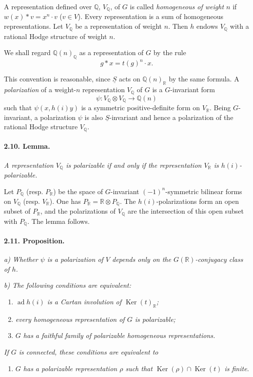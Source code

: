 \documentclass[10pt,leqno]{article}
\newcommand{\Q}{\mathbb{Q}}
\newcommand{\R}{\mathbb{R}}
\newcommand{\Ker}{\operatorname{Ker}}
\newcommand{\ad}{\operatorname{ad}}
\begin{document}
A representation defined over $\Q$, $V_\Q$, of $G$ is called \emph{homogeneous of weight $n$} if $w(x)*v=x^n\cdot v$ ($v\in V$). Every representation is a sum of homogeneous representations. Let $V_\Q$ be a representation of weight $n$. Then $h$ endows $V_\Q$ with a rational Hodge structure of weight $n$.

We shall regard $\Q(n)_\Q$ as a representation of $G$ by the rule
\[
g*x=t(g)^n\cdot x.
\]

\clearpage

This convention is reasonable, since $\underline S$ acts on $\Q(n)_\R$ by the same formula. A \emph{polarization} of a weight-$n$ representation $V_\Q$ of $G$ is a $G$-invariant form
\[
\psi:V_\Q\otimes V_\Q\longrightarrow\Q(n)
\]
such that $\psi(x,h(i)y)$ is a symmetric positive-definite form on $V_\R$. Being $G$-invariant, a polarization $\psi$ is also $\underline S$-invariant and hence a polarization of the rational Hodge structure $V_\Q$.

\paragraph{2.10. Lemma.} \emph{A representation $V_\Q$ is polarizable if and only if the representation $V_\R$ is $h(i)$-polarizable.}

Let $P_\Q$ (resp. $P_\R$) be the space of $G$-invariant $(-1)^n$-symmetric bilinear forms on $V_\Q$ (resp. $V_\R$). One has $P_\R=\R\otimes P_\Q$. The $h(i)$-polarizations form an open subset of $P_\R$, and the polarizations of $V_\Q$ are the intersection of this open subset with $P_\Q$. The lemma follows.

\paragraph{2.11. Proposition.} \emph{a) Whether $\psi$ is a polarization of $V$ depends only on the $G(\R)$-conjugacy class of $h$.}

\emph{b) The following conditions are equivalent:}
\begin{enumerate}[label=(\roman*)]
\item \emph{$\ad h(i)$ is a Cartan involution of $\Ker(t)_\R$;}
\item \emph{every homogeneous representation of $G$ is polarizable;}
\item \emph{$G$ has a faithful family of polarizable homogeneous representations.}
\end{enumerate}
\emph{If $G$ is connected, these conditions are equivalent to}
\begin{enumerate}[label=(iii\textquotesingle)]
\item \emph{$G$ has a polarizable representation $\rho$ such that $\Ker(\rho)\cap\Ker(t)$ is finite.}
\end{enumerate}
\end{document}
